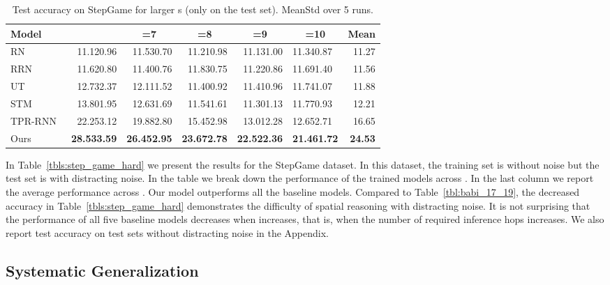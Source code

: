 \documentclass[letterpaper]{article} \usepackage{aaai22}  \usepackage{times}  \usepackage{helvet}  \usepackage{courier}  \usepackage[hyphens]{url}  \usepackage{graphicx} \urlstyle{rm} \def\UrlFont{\rm}  \usepackage{natbib}  \usepackage{caption} \DeclareCaptionStyle{ruled}{labelfont=normalfont,labelsep=colon,strut=off} \frenchspacing  \setlength{\pdfpagewidth}{8.5in}  \setlength{\pdfpageheight}{11in}  \usepackage{algorithm}
\begin{document}
 \begin{table*}[!th]
\small
\centering
\begin{adjustbox}{max width=0.92\textwidth}
\begin{tabular}{l|rrrrl|r}
\hline
\hline
Model & \multicolumn{1}{c}{} & \multicolumn{1}{c}{=7} & \multicolumn{1}{c}{=8} & \multicolumn{1}{c}{=9} & \multicolumn{1}{c|}{=10} & Mean \\ \hline
RN~\cite{santoro2017simple}       & 11.120.96 & 11.530.70 & 11.210.98 & 11.131.00 & 11.340.87 & 11.27 \\
RRN~\cite{palm2018recurrent}      & 11.620.80 & 11.400.76 & 11.830.75 & 11.220.86 & 11.691.40 & 11.56 \\
UT~\cite{dehghani2018universal}   & 12.732.37 & 12.111.52 & 11.400.92 & 11.410.96 & 11.741.07 & 11.88 \\
STM~\cite{le2020self}             & 13.801.95 & 12.631.69 & 11.541.61 & 11.301.13 & 11.770.93 & 12.21 \\
TPR-RNN~\cite{schlag2018learning} & 22.253.12 & 19.882.80 & 15.452.98 & 13.012.28 & 12.652.71 & 16.65 \\ \hline
Ours                              & \textbf{28.533.59}    & \textbf{26.452.95} & \textbf{23.672.78} & \textbf{22.522.36} & \textbf{21.461.72} & \textbf{24.53} \\ \hline
\hline
\end{tabular}
\end{adjustbox}
\caption{Test accuracy on StepGame for larger s (only on the test set). MeanStd over 5 runs.}
\label{tbl:step_game_hard_extra}
\end{table*} 
In Table~\ref{tbls:step_game_hard} we present the results for the StepGame dataset. 
In this dataset, the training set is without noise but the test set is with distracting noise.
In the table we break down the performance of the trained models across . In the last column we report the average performance across .
Our model outperforms all the baseline models. Compared to Table~\ref{tbl:babi_17_19}, the decreased accuracy in Table~\ref{tbls:step_game_hard} demonstrates the difficulty of spatial reasoning with distracting noise. It is not surprising that the performance of all five baseline models decreases when  increases, that is, when the number of required inference hops increases. 
We also report test accuracy on test sets without distracting noise in the Appendix.
\subsection{Systematic Generalization}
\end{document}
